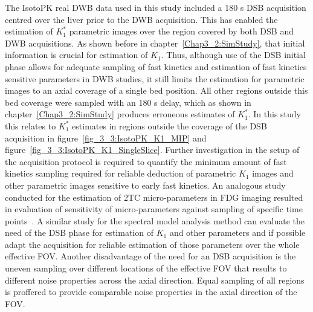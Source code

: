 The IsotoPK real DWB data used in this study included a 180 s DSB acquisition centred over the liver prior to the DWB acquisition. This has enabled the estimation of $K_1^{*}$ parametric images over the region covered by both DSB and DWB acquisitions. As shown before in chapter~\ref{Chap3_2:SimStudy}, that initial information is crucial for estimation of $K_1$. Thus, although use of the DSB initial phase allows for adequate sampling of fast kinetics and estimation of fast kinetics sensitive parameters in DWB studies, it still limits the estimation for parametric images to an axial coverage of a single bed position. All other regions outside this bed coverage were sampled with an 180 s delay, which as shown in chapter~\ref{Chap3_2:SimStudy} produces erroneous estimates of $K_1^{*}$. 
In this study this relates to $K_1^{*}$ estimates in regions outside the coverage of the DSB acquisition in figure~\ref{fig_3_3:IsotoPK_K1_MIP} and figure~\ref{fig_3_3:IsotoPK_K1_SingleSlice}. 
Further investigation in the setup of the acquisition protocol is required to quantify the minimum amount of fast kinetics sampling required for reliable deduction of parametric $K_1$ images and other parametric images sensitive to early fast kinetics. An analogous study conducted for the estimation of 2TC micro-parameters in FDG imaging resulted in evaluation of sensitivity of micro-parameters against sampling of specific time points~\cite{Zuo2019}. A similar study for the spectral model analysis method can evaluate the need of the DSB phase for estimation of $K_1$ and other parameters and if possible adapt the acquisition for reliable estimation of those parameters over the whole effective FOV. 
Another disadvantage of the need for an DSB acquisition is the uneven sampling over different locations of the effective FOV that results to different noise properties across the axial direction. Equal sampling of all regions is proffered to provide comparable noise properties in the axial direction of the FOV.

